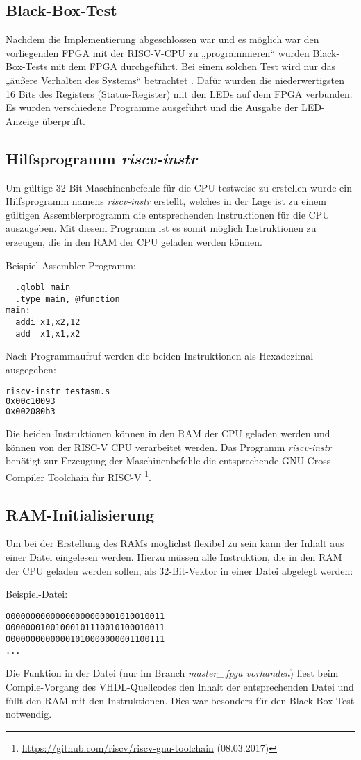 \subsection{Black-Box-Test}
Nachdem die Implementierung abgeschlossen war und es möglich war den
vorliegenden FPGA mit der RISC-V-CPU zu „programmieren“ wurden
Black-Box-Tests mit dem FPGA durchgeführt. Bei einem solchen Test wird
nur das „äußere Verhalten des Systems“ betrachtet \cite[S. 311]{Kleuker}. Dafür wurden die niederwertigsten 16 Bits
des Registers  (Status-Register) mit den LEDs auf dem FPGA verbunden. Es
wurden verschiedene Programme ausgeführt und die Ausgabe der LED-Anzeige
überprüft.

\subsection{Hilfsprogramm \emph{riscv-instr}}
Um gültige 32 Bit Maschinenbefehle für die CPU testweise zu erstellen
wurde ein Hilfsprogramm namens \emph{riscv-instr} erstellt, welches in
der Lage ist zu einem gültigen Assemblerprogramm die entsprechenden
Instruktionen für die CPU auszugeben. Mit diesem Programm ist es somit
möglich Instruktionen zu erzeugen, die in den RAM der CPU geladen werden
können.

Beispiel-Assembler-Programm:
\begin{lstlisting}
  .globl main
  .type main, @function
main:
  addi x1,x2,12 
  add  x1,x1,x2
\end{lstlisting}

Nach Programmaufruf werden die beiden Instruktionen als Hexadezimal
ausgegeben:
\begin{lstlisting}[language=bash]
riscv-instr testasm.s
0x00c10093 
0x002080b3 
\end{lstlisting}
Die beiden Instruktionen können in den RAM der CPU geladen werden und
können von der RISC-V CPU verarbeitet werden. Das Programm
\emph{riscv-instr} benötigt zur Erzeugung der Maschinenbefehle die 
entsprechende GNU Cross Compiler Toolchain für RISC-V
\footnote{\url{https://github.com/riscv/riscv-gnu-toolchain}
(08.03.2017)}. 

\subsection{RAM-Initialisierung}
Um bei der Erstellung des RAMs möglichst flexibel zu sein kann der
Inhalt aus einer Datei eingelesen werden. \cite[S. 187]{XST}
Hierzu müssen alle Instruktion, die in den RAM der CPU geladen werden
sollen, als 32-Bit-Vektor in einer Datei abgelegt werden:

Beispiel-Datei:
\begin{lstlisting}
00000000000000000000001010010011
00000001001000101110010100010011
00000000000001010000000001100111
...
\end{lstlisting}

Die Funktion  in der Datei 
(nur im Branch \emph{master\_\,fpga vorhanden}) liest beim Compile-Vorgang
des VHDL-Quellcodes den Inhalt der entsprechenden Datei und füllt den RAM mit den
Instruktionen. Dies war besonders für den Black-Box-Test notwendig.
